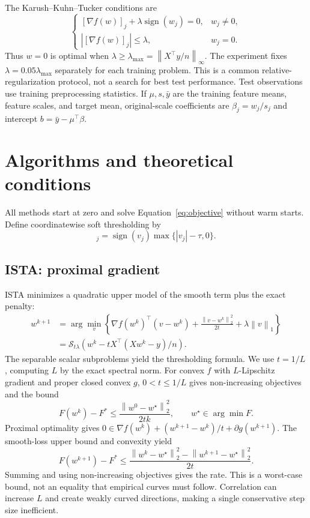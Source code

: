 \documentclass{article}
\newcommand{\norm}[1]{\left\|#1\right\|}
\newcommand{\soft}{\mathcal{S}}
\begin{document}
The Karush--Kuhn--Tucker conditions are
\begin{equation}\label{eq:kkt}
 \begin{cases}
 [\nabla f(w)]_j+\lambda\operatorname{sign}(w_j)=0,&w_j\ne0,\\
 |[\nabla f(w)]_j|\le\lambda,&w_j=0.
 \end{cases}
\end{equation}
Thus $w=0$ is optimal when $\lambda\ge\lambda_{\max}=\norm{X^\top y/n}_\infty$. The experiment fixes $\lambda=0.05\lambda_{\max}$ separately for each training problem. This is a common relative-regularization protocol, not a search for best test performance. Test observations use training preprocessing statistics. If $\mu,s,\bar y$ are the training feature means, feature scales, and target mean, original-scale coefficients are $\beta_j=w_j/s_j$ and intercept $b=\bar y-\mu^\top\beta$.

\section{Algorithms and theoretical conditions}
All methods start at zero and solve Equation~\eqref{eq:objective} without warm starts. Define coordinatewise soft thresholding by
\begin{equation}
 [\soft_\tau(v)]_j=\operatorname{sign}(v_j)\max\{|v_j|-\tau,0\}.
\end{equation}

\subsection{ISTA: proximal gradient}
ISTA minimizes a quadratic upper model of the smooth term plus the exact penalty:
\begin{align}
 w^{k+1}&=\arg\min_v\left\{\nabla f(w^k)^\top(v-w^k)+\frac{\norm{v-w^k}_2^2}{2t}+\lambda\norm{v}_1\right\}\\
 &=\soft_{t\lambda}\left(w^k-tX^\top(Xw^k-y)/n\right).
\end{align}
The separable scalar subproblems yield the thresholding formula. We use $t=1/L$, computing $L$ by the exact spectral norm. For convex $f$ with $L$-Lipschitz gradient and proper closed convex $g$, $0<t\le1/L$ gives non-increasing objectives and the bound
\begin{equation}
 F(w^k)-F^*\le\frac{\norm{w^0-w^\star}_2^2}{2tk},\qquad w^\star\in\arg\min F.
\end{equation}
Proximal optimality gives $0\in\nabla f(w^k)+(w^{k+1}-w^k)/t+\partial g(w^{k+1})$. The smooth-loss upper bound and convexity yield
\begin{equation}
 F(w^{k+1})-F^*\le\frac{\norm{w^k-w^\star}_2^2-\norm{w^{k+1}-w^\star}_2^2}{2t}.
\end{equation}
Summing and using non-increasing objectives gives the rate. This is a worst-case bound, not an equality that empirical curves must follow. Correlation can increase $L$ and create weakly curved directions, making a single conservative step size inefficient.
\end{document}
